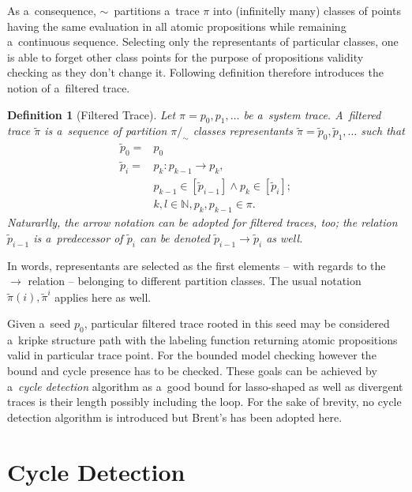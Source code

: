 \documentclass[12pt,oneside,draft]{fithesis}
\newcommand{\mNatural}{\mathbb{N}}
\newtheorem{mydef}{Definition}
\begin{document}
As a~consequence, $\sim$~partitions a~trace $\pi$ into
(infinitelly many) classes of points having the same evaluation in all
atomic propositions while remaining a~continuous sequence. Selecting
only the representants of particular classes, one is able to forget
other class points for the purpose of propositions validity checking
as they don't change it. Following definition therefore introduces
the notion of a~filtered trace.
\begin{mydef}[Filtered Trace] Let $\pi=p_0,p_1,\dotsc$ be a~system
trace. A~filtered trace $\tilde{\pi}$ is a~sequence of partition
$\pi/_{\sim}$ classes representants
$\tilde{\pi}=\tilde{p}_0,\tilde{p}_1,\dotsc$ such that
\begin{align}
\tilde{p}_{0}=&p_0\\
\tilde{p}_{i}=&p_k:p_{k-1}\rightarrow p_{k},\nonumber\\
	&p_{k-1}\in[\tilde{p}_{i-1}]
	\wedge p_k\in[\tilde{p}_{i}];\nonumber\\
	&k,l\in\mNatural,p_k,p_{k-1}\in\pi.
\end{align}
Naturarlly, the arrow notation can be adopted for filtered traces, too;
the relation $\tilde{p}_{i-1}$ is a~predecessor of $\tilde{p}_{i}$ can
be denoted $\tilde{p}_{i-1}\rightarrow\tilde{p}_{i}$ as well.
\end{mydef}
In words, representants are selected as the first elements -- with
regards to the $\rightarrow$ relation -- belonging to different
partition classes. The usual notation $\tilde{\pi}(i),\tilde{\pi}^i$
applies here as well.

Given a~seed $p_0$, particular filtered trace rooted in this seed may be
considered a~kripke structure path with the labeling function returning
atomic propositions valid in particular trace point. For the bounded
model checking however the bound and cycle presence has to be checked.
These goals can be achieved by a~\emph{cycle detection} algorithm as
a~good bound for lasso-shaped as well as divergent traces is their
length possibly including the loop\cite{biere}. For the sake of brevity,
no cycle detection algorithm is introduced but
Brent's\cite{wloop,brent} has been adopted here.

\section{Cycle Detection}
\end{document}
